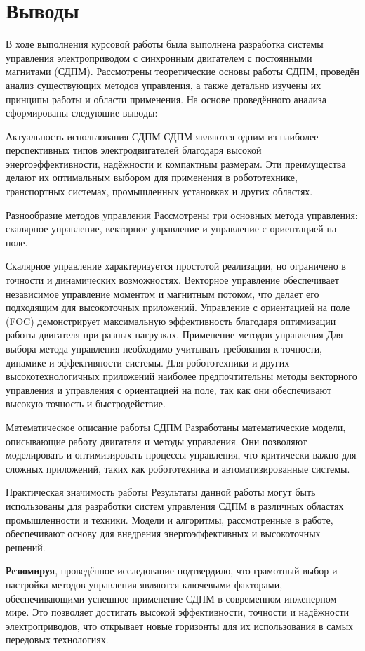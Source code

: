 \documentclass[a4paper,14pt]{extarticle} %
\begin{document}
\section*{Выводы}

В ходе выполнения курсовой работы была выполнена разработка системы управления электроприводом с синхронным двигателем с постоянными магнитами (СДПМ). Рассмотрены теоретические основы работы СДПМ, проведён анализ существующих методов управления, а также детально изучены их принципы работы и области применения. На основе проведённого анализа сформированы следующие выводы:

Актуальность использования СДПМ
СДПМ являются одним из наиболее перспективных типов электродвигателей благодаря высокой энергоэффективности, надёжности и компактным размерам. Эти преимущества делают их оптимальным выбором для применения в робототехнике, транспортных системах, промышленных установках и других областях.

Разнообразие методов управления
Рассмотрены три основных метода управления: скалярное управление, векторное управление и управление с ориентацией на поле.

Скалярное управление характеризуется простотой реализации, но ограничено в точности и динамических возможностях.
Векторное управление обеспечивает независимое управление моментом и магнитным потоком, что делает его подходящим для высокоточных приложений.
Управление с ориентацией на поле (FOC) демонстрирует максимальную эффективность благодаря оптимизации работы двигателя при разных нагрузках.
Применение методов управления
Для выбора метода управления необходимо учитывать требования к точности, динамике и эффективности системы. Для робототехники и других высокотехнологичных приложений наиболее предпочтительны методы векторного управления и управления с ориентацией на поле, так как они обеспечивают высокую точность и быстродействие.

Математическое описание работы СДПМ
Разработаны математические модели, описывающие работу двигателя и методы управления. Они позволяют моделировать и оптимизировать процессы управления, что критически важно для сложных приложений, таких как робототехника и автоматизированные системы.

Практическая значимость работы
Результаты данной работы могут быть использованы для разработки систем управления СДПМ в различных областях промышленности и техники. Модели и алгоритмы, рассмотренные в работе, обеспечивают основу для внедрения энергоэффективных и высокоточных решений.

\textbf{Резюмируя}, проведённое исследование подтвердило, что грамотный выбор и настройка методов управления являются ключевыми факторами, обеспечивающими успешное применение СДПМ в современном инженерном мире. Это позволяет достигать высокой эффективности, точности и надёжности электроприводов, что открывает новые горизонты для их использования в самых передовых технологиях.
\end{document}
